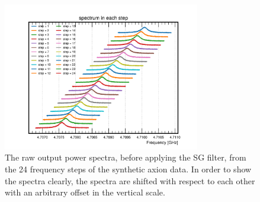 \begin{figure}[htbp]                                                                                                  
    \centering                                                                                                                       
    \includegraphics[width=8.6cm]{figures/faxion_rawpower_24steps.png}
 \caption{The raw output power spectra, before applying the 
 SG filter, from the 24 frequency steps of the synthetic axion 
data. In order to show the spectra clearly, the spectra are shifted 
with respect to each other with an arbitrary offset in the vertical scale.}                
\label{fig:faxionstep}                                                                                                            
\end{figure}                       



